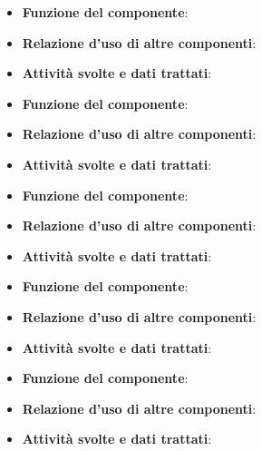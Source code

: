 
\begin{itemize}
	\item\textbf{Funzione del componente}: 
	\item\textbf{Relazione d'uso di altre componenti}: 
	\item\textbf{Attività svolte e dati trattati}:
\end{itemize}


\begin{itemize}
	\item\textbf{Funzione del componente}: 
	\item\textbf{Relazione d'uso di altre componenti}: 
	\item\textbf{Attività svolte e dati trattati}:
\end{itemize}


\begin{itemize}
	\item\textbf{Funzione del componente}: 
	\item\textbf{Relazione d'uso di altre componenti}: 
	\item\textbf{Attività svolte e dati trattati}:
\end{itemize}


\begin{itemize}
	\item\textbf{Funzione del componente}: 
	\item\textbf{Relazione d'uso di altre componenti}: 
	\item\textbf{Attività svolte e dati trattati}:
\end{itemize}


\begin{itemize}
	\item\textbf{Funzione del componente}: 
	\item\textbf{Relazione d'uso di altre componenti}: 
	\item\textbf{Attività svolte e dati trattati}:
\end{itemize}


